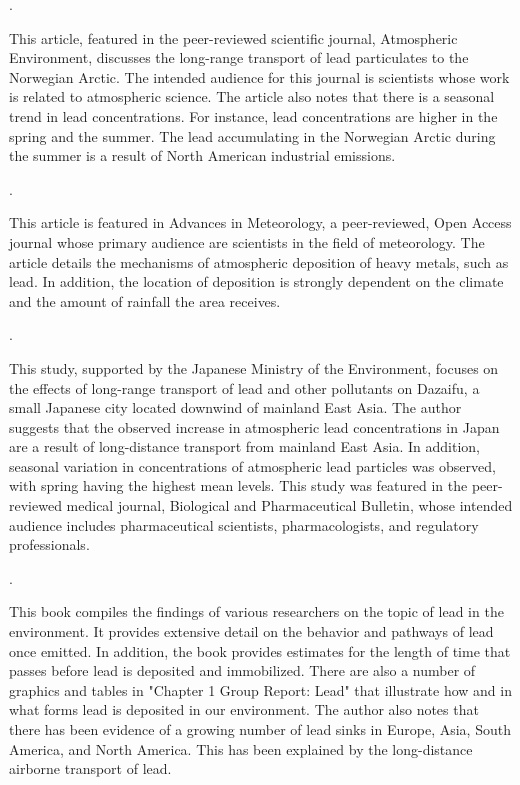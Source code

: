\documentclass{article}\usepackage[]{graphicx}\usepackage[]{color}
\begin{document}
\medskip

\noindent {}.

\medskip

This article, featured in the peer-reviewed scientific journal, Atmospheric Environment, discusses the long-range transport of lead particulates to the Norwegian Arctic. The intended audience for this journal is scientists whose work is related to atmospheric science. The article also notes that there is a seasonal trend in lead concentrations. For instance, lead concentrations are higher in the spring and the summer. The lead accumulating in the Norwegian Arctic during the summer is a result of North American industrial emissions. 
\medskip

\noindent {}.

\medskip

This article is featured in Advances in Meteorology, a peer-reviewed, Open Access journal whose primary audience are scientists in the field of meteorology. The article details the mechanisms of atmospheric deposition of heavy metals, such as lead. In addition, the location of deposition is strongly dependent on the climate and the amount of rainfall the area receives. 

\medskip

\noindent {}.

\medskip

This study, supported by the Japanese Ministry of the Environment, focuses on the effects of long-range transport of lead and other pollutants on Dazaifu, a small Japanese city located downwind of mainland East Asia. The author suggests that the observed increase in atmospheric lead concentrations in Japan are a result of long-distance transport from mainland East Asia. In addition, seasonal variation in concentrations of atmospheric lead particles was observed, with spring having the highest mean levels. This study was featured in the peer-reviewed medical journal, Biological and Pharmaceutical Bulletin, whose intended audience includes pharmaceutical scientists, pharmacologists, and regulatory professionals. 

\medskip

\noindent {}.

\medskip

This book compiles the findings of various researchers on the topic of lead in the environment. It provides extensive detail on the behavior and pathways of lead once emitted. In addition, the book provides estimates for the length of time that passes before lead is deposited and immobilized. There are also a number of graphics and tables in "Chapter 1 Group Report: Lead" that illustrate how and in what forms lead is deposited in our environment. The author also notes that there has been evidence of a growing number of lead sinks in Europe, Asia, South America, and North America. This has been explained by the long-distance airborne transport of lead.
\end{document}
